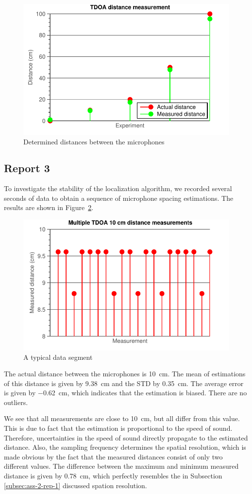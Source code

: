 \documentclass[11pt,titlepage]{report}
\begin{document}
\begin{figure}[H]
	\centering
	\includegraphics[width=.6\linewidth]{../../deliverable-7-resources/figures/ass-2/report-2-3/ass-2-report-2-results.pdf}
	\caption{Determined distances between the microphones}
	\label{fig:ass-2-rep-2-res}
\end{figure}

\subsection{Report 3}
To investigate the stability of the localization algorithm, we recorded several seconds of data to obtain a sequence of microphone spacing estimations. The results are shown in Figure~\ref{fig:ass-2-rep-3}.

\begin{figure}[H]
	\begin{center}
		\includegraphics[width=.6\linewidth]{../../deliverable-7-resources/figures/ass-2/report-2-3/ass-2-report-3.pdf}
	\end{center}
	\caption{A typical data segment}
	\label{fig:ass-2-rep-3}
\end{figure}

The actual distance between the microphones is \SI{10}{cm}. The mean of estimations of this distance is given by \SI{9.38}{cm} and the STD by \SI{0.35}{cm}. The average error is given by \SI{-0.62}{cm}, which indicates that the estimation is biased. There are no outliers.

We see that all measurements are close to \SI{10}{cm}, but all differ from this value. This is due to fact that the estimation is proportional to the speed of sound. Therefore, uncertainties in the speed of sound directly propagate to the estimated distance. Also, the sampling frequency determines the spatial resolution, which is made obvious by the fact that the measured distances consist of only two different values. The difference between the maximum and minimum measured distance is given by \SI{0.78}{cm}, which perfectly resembles the in Subsection \ref{subsec:ass-2-rep-1} discussed spation resolution.
\end{document}
